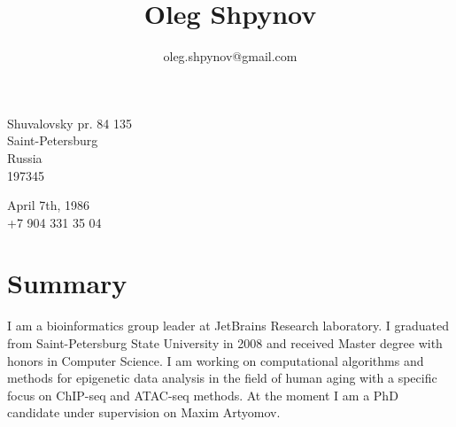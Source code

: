 \documentclass[10pt]{article}
\title{\bfseries\Huge Oleg Shpynov}
\author{oleg.shpynov@gmail.com}
\date{}
\begin{document}
\maketitle
\vspace{1em}
\begin{minipage}[ht]{0.75\textwidth}
Shuvalovsky pr. 84 135\\
Saint-Petersburg\\
Russia\\
197345
\end{minipage}
\begin{minipage}[ht]{0.25\textwidth}
April 7th, 1986\\
+7 904 331 35 04
\end{minipage}
\vspace{20pt}
 
\section*{Summary}
I am a bioinformatics group leader at JetBrains Research laboratory. I graduated from Saint-Petersburg State University in 2008 and received Master degree with honors in Computer Science. I am working on computational algorithms and methods for epigenetic data analysis in the field of human aging with a specific focus on ChIP-seq and ATAC-seq methods. At the moment I am a PhD candidate under supervision on Maxim Artyomov.
\end{document}

